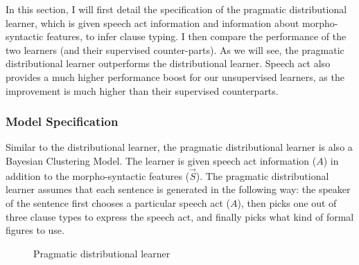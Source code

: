 In this section, I will first detail the specification of the pragmatic distributional learner, which is given speech act information and information about morpho-syntactic features, to infer clause typing. I then compare the performance of the two learners (and their supervised counter-parts). As we will see, the pragmatic distributional learner outperforms the distributional learner. Speech act also provides a much higher performance boost for our unsupervised learners, as the improvement is much higher than their supervised counterparts.


\subsubsection{Model Specification}
\label{sec:engcl:model:prag:spec}


Similar to the distributional learner, the pragmatic distributional learner is also a Bayesian Clustering Model. The learner is given speech act information ($A$) in addition to the morpho-syntactic features ($\vec{S}$). The pragmatic distributional learner assumes that each sentence is generated in the following way: the speaker of the sentence first chooses a particular speech act ($A$), then picks one out of three clause types to express the speech act, and finally picks what kind of formal figures to use. 



\begin{figure}[H]
\begin{center}
\end{center}
\caption{Pragmatic distributional learner}\label{fig:target-model}
\end{figure}

